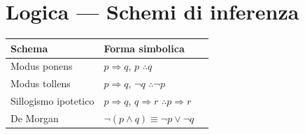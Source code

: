 \documentclass[12pt, a4paper, twoside, openright]{book}
\theoremstyle{definition}
\begin{document}
\section*{Logica --- Schemi di inferenza}

\begin{center}
\renewcommand{\arraystretch}{1.3}
\begin{tabular}{lll}
\toprule
\textbf{Schema} & \textbf{Forma simbolica} \\
\midrule
Modus ponens & $p \Rightarrow q$,\; $p$ \; $\therefore q$ \\
Modus tollens & $p \Rightarrow q$,\; $\neg q$ \; $\therefore \neg p$ \\
Sillogismo ipotetico & $p\Rightarrow q$,\; $q\Rightarrow r$ \; $\therefore p\Rightarrow r$ \\
De Morgan & $\neg(p \land q) \equiv \neg p \lor \neg q$ \\
\bottomrule
\end{tabular}
\end{center}

\end{document}
